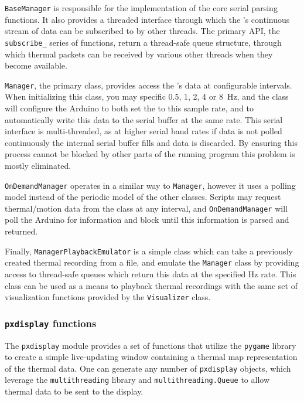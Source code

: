 \documentclass[../thesis/thesis.tex]{subfiles}
\begin{document}
\texttt{BaseManager} is responsible for the implementation of the core serial parsing functions. It also provides a threaded interface through which the \mlx's continuous stream of data can be subscribed to by other threads. The primary API, the \texttt{subscribe\_} series of functions, return a thread-safe queue structure, through which thermal packets can be received by various other threads when they become available.

\texttt{Manager}, the primary class, provides access the \mlx's data at configurable intervals. When initializing this class, you may specific 0.5, 1, 2, 4 or 8~Hz, and the class will configure the Arduino to both set the \mlx to this sample rate, and to automatically write this data to the serial buffer at the same rate. This serial interface is multi-threaded, as at higher serial baud rates if data is not polled continuously the internal serial buffer fills and data is discarded. By ensuring this process cannot be blocked by other parts of the running program this problem is mostly eliminated. 

\texttt{OnDemandManager} operates in a similar way to \texttt{Manager}, however it uses a polling model instead of the periodic model of the other classes. Scripts may request thermal/motion data from the class at any interval, and \texttt{OnDemandManager} will poll the Arduino for information and block until this information is parsed and returned.

Finally, \texttt{ManagerPlaybackEmulator} is a simple class which can take a previously created thermal recording from a file, and emulate the \texttt{Manager} class by providing access to thread-safe queues which return this data at the specified Hz rate. This class can be used as a means to playback thermal recordings with the same set of visualization functions provided by the \texttt{Visualizer} class.

\subsubsection*{\texttt{pxdisplay} functions}

The \texttt{pxdisplay} module provides a set of functions that utilize the \texttt{pygame} library to create a simple live-updating window containing a thermal map representation of the thermal data. One can generate any number of \texttt{pxdisplay} objects, which leverage the \texttt{multithreading} library and \texttt{multithreading.Queue} to allow thermal data to be sent to the display.
\end{document}
